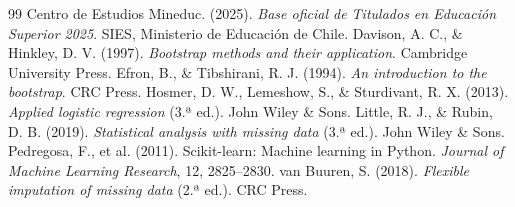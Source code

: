 \documentclass[11pt,a4paper]{article}
\begin{document}
\begin{thebibliography}{99}
\small
{} Centro de Estudios Mineduc. (2025). \textit{Base oficial de Titulados en Educación Superior 2025}. SIES, Ministerio de Educación de Chile.
 Davison, A. C., \& Hinkley, D. V. (1997). \textit{Bootstrap methods and their application}. Cambridge University Press.
 Efron, B., \& Tibshirani, R. J. (1994). \textit{An introduction to the bootstrap}. CRC Press.
 Hosmer, D. W., Lemeshow, S., \& Sturdivant, R. X. (2013). \textit{Applied logistic regression} (3.ª ed.). John Wiley \& Sons.
 Little, R. J., \& Rubin, D. B. (2019). \textit{Statistical analysis with missing data} (3.ª ed.). John Wiley \& Sons.
 Pedregosa, F., et al. (2011). Scikit-learn: Machine learning in Python. \textit{Journal of Machine Learning Research}, 12, 2825--2830.
 van Buuren, S. (2018). \textit{Flexible imputation of missing data} (2.ª ed.). CRC Press.
\end{thebibliography}
\end{document}
